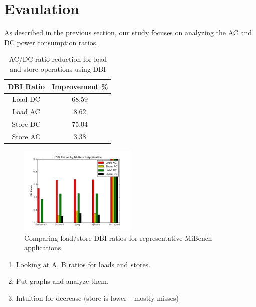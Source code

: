 \section{Evaulation}
\label{sec-evaluation}


As described in the previous section, our study focuses on analyzing the AC and
DC power consumption ratios.

\begin{table}[!htb]
  \centering
    \begin{tabular}{| c | c |}
      \hline
      \textbf{DBI Ratio} & \textbf{Improvement \%} \\ \hline
     Load DC  & 68.59 \\ \hline
     Load AC  & 8.62  \\ \hline
     Store DC & 75.04 \\ \hline
     Store AC & 3.38  \\ \hline
    \end{tabular}
    \caption{AC/DC ratio reduction for load and store operations using DBI}
    \label{table:dbi-ratios}
\end{table}

\begin{figure}[!htb]
  \centering
  \includegraphics[width=0.5\textwidth]{figs/dbiGraph}
  \caption{Comparing load/store DBI ratios for representative MiBench applications}
  \label{fig:dbiGraph}
\end{figure}

\begin{enumerate}
  \item Looking at A, B ratios for loads and stores.
  \item Put graphs and analyze them.
  \item Intuition for decrease (store is lower - mostly misses)
\end{enumerate}

